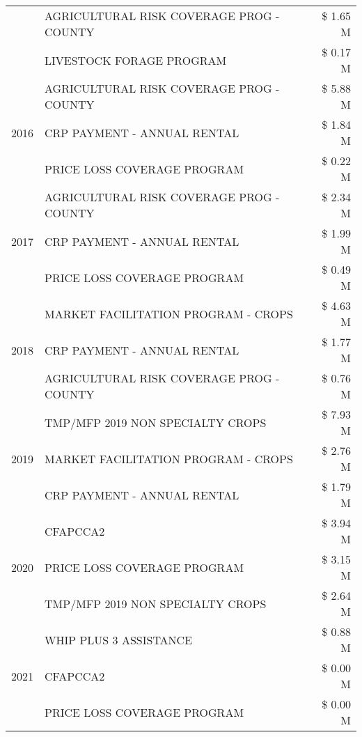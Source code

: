 \begin{tabular}{llr}
 & AGRICULTURAL RISK COVERAGE PROG - COUNTY & \$ 1.65 M \\
 & LIVESTOCK FORAGE PROGRAM & \$ 0.17 M \\
\cline{1-3}
\multirow[t]{3}{*}{2016} & AGRICULTURAL RISK COVERAGE PROG - COUNTY & \$ 5.88 M \\
 & CRP PAYMENT - ANNUAL RENTAL & \$ 1.84 M \\
 & PRICE LOSS COVERAGE PROGRAM & \$ 0.22 M \\
\cline{1-3}
\multirow[t]{3}{*}{2017} & AGRICULTURAL RISK COVERAGE PROG - COUNTY & \$ 2.34 M \\
 & CRP PAYMENT - ANNUAL RENTAL & \$ 1.99 M \\
 & PRICE LOSS COVERAGE PROGRAM & \$ 0.49 M \\
\cline{1-3}
\multirow[t]{3}{*}{2018} & MARKET FACILITATION PROGRAM - CROPS & \$ 4.63 M \\
 & CRP PAYMENT - ANNUAL RENTAL & \$ 1.77 M \\
 & AGRICULTURAL RISK COVERAGE PROG - COUNTY & \$ 0.76 M \\
\cline{1-3}
\multirow[t]{3}{*}{2019} & TMP/MFP 2019 NON SPECIALTY CROPS & \$ 7.93 M \\
 & MARKET FACILITATION PROGRAM - CROPS & \$ 2.76 M \\
 & CRP PAYMENT - ANNUAL RENTAL & \$ 1.79 M \\
\cline{1-3}
\multirow[t]{3}{*}{2020} & CFAPCCA2 & \$ 3.94 M \\
 & PRICE LOSS COVERAGE PROGRAM & \$ 3.15 M \\
 & TMP/MFP 2019 NON SPECIALTY CROPS & \$ 2.64 M \\
\cline{1-3}
\multirow[t]{3}{*}{2021} & WHIP PLUS 3 ASSISTANCE & \$ 0.88 M \\
 & CFAPCCA2 & \$ 0.00 M \\
 & PRICE LOSS COVERAGE PROGRAM & \$ 0.00 M \\
\cline{1-3}
\bottomrule
\end{tabular}
